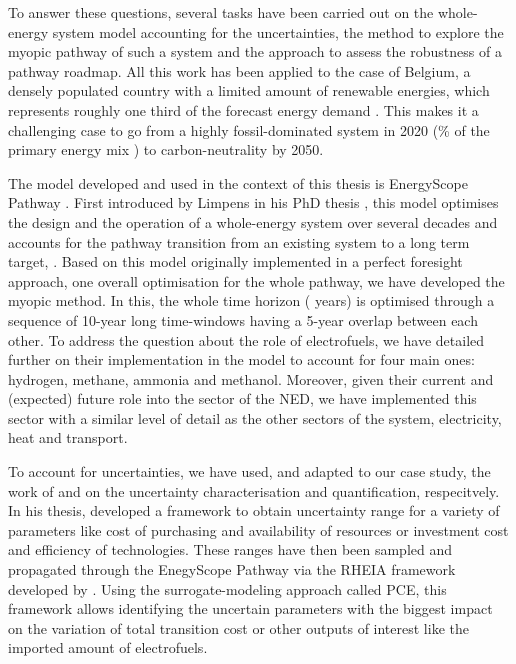 To answer these questions, several tasks have been carried out on the whole-energy system model accounting for the uncertainties, the method to explore the myopic pathway of such a system and the approach to assess the robustness of a pathway roadmap.  All this work has been applied to the case of Belgium, a densely populated country with a limited amount of renewable energies, which represents roughly one third of the forecast energy demand \cite{Limpens2020}. This makes it a challenging case to go from a highly fossil-dominated system in 2020 (\% of the primary energy mix \cite{spf_economy_2022}) to carbon-neutrality by 2050. 

The model developed and used in the context of this thesis is EnergyScope Pathway \cite{limpens2024pathway}. First introduced by Limpens in his PhD thesis \cite{limpens2021generating}, this model optimises the design and the operation of a whole-energy system over several decades and accounts for the pathway transition from an existing system to a long term target, . Based on this model originally implemented in a perfect foresight approach, \ie one overall optimisation for the whole pathway, we have developed the myopic method. In this, the whole time horizon ( years) is optimised through a sequence of 10-year long time-windows having a 5-year overlap between each other. To address the question about the role of electrofuels, we have detailed further on their implementation in the model to account for four main ones: hydrogen, methane, ammonia and methanol. Moreover, given their current and (expected) future role into the sector of the \gls{NED}, we have implemented this sector with a similar level of detail as the other sectors of the system, \ie electricity, heat and transport. 

To account for uncertainties, we have used, and adapted to our case study, the work of \citet{Moret2017PhDThesis} and \citet{coppittersthesis} on the uncertainty characterisation and quantification, respecitvely. In his thesis, \citet{Moret2017PhDThesis} developed a framework to obtain uncertainty range for a variety of parameters like cost of purchasing and availability of resources or investment cost and efficiency of technologies. These ranges have then been sampled and propagated through the EnegyScope Pathway via the RHEIA framework developed by \citet{coppittersthesis}. Using the surrogate-modeling approach called \gls{PCE}, this framework allows identifying the uncertain parameters with the biggest impact on the variation of total transition cost or other outputs of interest like the imported amount of electrofuels. 

